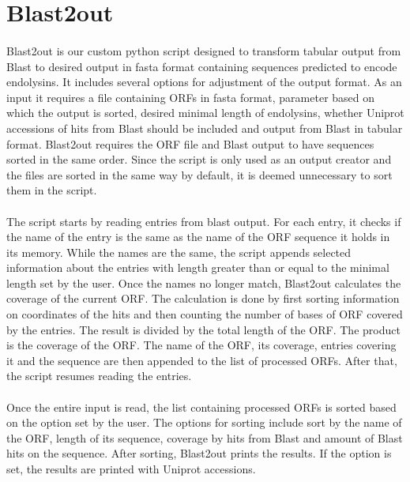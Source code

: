 \section{Blast2out}
\paragraph*{}
Blast2out is our custom python script designed to transform tabular output from Blast to desired output in fasta format containing sequences predicted to encode endolysins. It includes several options for adjustment of the output format. As an input it requires a file containing ORFs in fasta format, parameter based on which the output is sorted, desired minimal length of endolysins, whether Uniprot accessions of hits from Blast should be included and output from Blast in tabular format. Blast2out requires the ORF file and Blast output to have sequences sorted in the same order. Since the script is only used as an output creator and the files are sorted in the same way by default, it is deemed unnecessary to sort them in the script. 
\paragraph*{}
The script starts by reading entries from blast output. For each entry, it checks if the name of the entry is the same as the name of the ORF sequence it holds in its memory. While the names are the same, the script appends selected information about the entries with length greater than or equal to the minimal length set by the user. Once the names no longer match, Blast2out calculates the coverage of the current ORF. The calculation is done by first sorting information on coordinates of the hits and then counting the number of bases of ORF covered by the entries. The result is divided by the total length of the ORF. The product is the coverage of the ORF. The name of the ORF, its coverage, entries covering it and the sequence are then appended to the list of processed ORFs. After that, the script resumes reading the entries.
\paragraph*{}
Once the entire input is read, the list containing processed ORFs is sorted based on the option set by the user. The options for sorting include sort by the name of the ORF, length of its sequence, coverage by hits from Blast and amount of Blast hits on the sequence. After sorting, Blast2out prints the results. If the option is set, the results are printed with Uniprot accessions.
